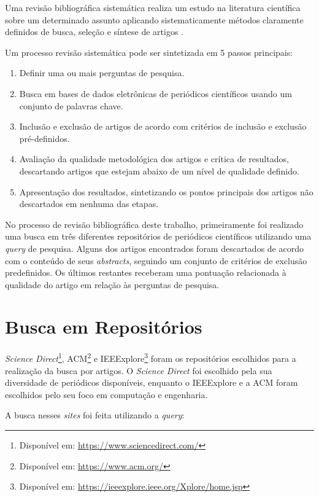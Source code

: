 \documentclass[12pt]{report}
\begin{document}
Uma revisão bibliográfica sistemática realiza um estudo na literatura científica sobre um determinado assunto aplicando sistematicamente métodos claramente definidos de busca, seleção e síntese de artigos \cite{sampaio2007}.

Um processo revisão sistemática pode ser sintetizada em 5 passos principais:

\begin{enumerate}
    \item Definir uma ou mais perguntas de pesquisa.
    \item Busca em bases de dados eletrônicas de periódicos científicos usando um conjunto de palavras chave.
    \item Inclusão e exclusão de artigos de acordo com critérios de inclusão e exclusão pré-definidos.
    \item Avaliação da qualidade metodológica dos artigos e crítica de resultados, descartando artigos que estejam abaixo de um nível de qualidade definido.
    \item Apresentação dos resultados, sintetizando os pontos principais dos artigos não descartados em nenhuma das etapas.
\end{enumerate}

No processo de revisão bibliográfica deste trabalho, primeiramente foi realizado uma busca em três diferentes repositórios de periódicos científicos utilizando uma \textit{query} de pesquisa. Alguns dos artigos encontrados foram descartados de acordo com o conteúdo de seus \textit{abstracts}, seguindo um conjunto de critérios de exclusão predefinidos. Os últimos restantes receberam uma pontuação relacionada à qualidade do artigo em relação às perguntas de pesquisa.

\section{Busca em Repositórios} \label{sec:busca_em_repositorios}

\textit{Science Direct}\footnote{Disponível em: \url{https://www.sciencedirect.com/}}, ACM\footnote{Disponível em: \url{https://www.acm.org/}} e IEEExplore\footnote{Disponível em: \url{https://ieeexplore.ieee.org/Xplore/home.jsp}} foram os repositórios escolhidos para a realização da busca por artigos. O \textit{Science Direct} foi escolhido pela sua diversidade de periódicos disponíveis, enquanto o IEEExplore e a ACM foram escolhidos pelo seu foco em computação e engenharia.

A busca nesses \textit{sites} foi feita utilizando a \textit{query}:
\end{document}
